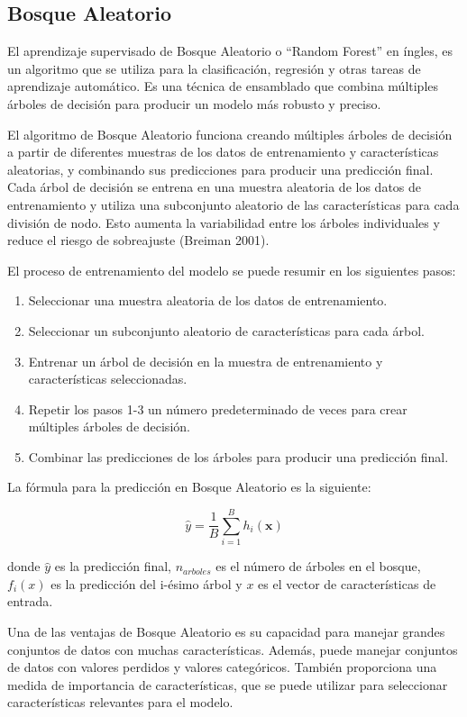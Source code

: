 \documentclass[a4paper,12pt]{article}
\begin{document}
\subsection{Bosque Aleatorio}

El aprendizaje supervisado de Bosque Aleatorio o ``Random Forest'' en íngles, es un algoritmo que se utiliza para la clasificación, regresión y otras tareas de aprendizaje automático. Es una técnica de ensamblado que combina múltiples árboles de decisión para producir un modelo más robusto y preciso.

El algoritmo de Bosque Aleatorio funciona creando múltiples árboles de decisión a partir de diferentes muestras de los datos de entrenamiento y características aleatorias, y combinando sus predicciones para producir una predicción final. Cada árbol de decisión se entrena en una muestra aleatoria de los datos de entrenamiento y utiliza una subconjunto aleatorio de las características para cada división de nodo. Esto aumenta la variabilidad entre los árboles individuales y reduce el riesgo de sobreajuste (Breiman 2001).

El proceso de entrenamiento del modelo se puede resumir en los siguientes pasos:

\begin{enumerate}
    \item Seleccionar una muestra aleatoria de los datos de entrenamiento.
    \item Seleccionar un subconjunto aleatorio de características para cada árbol.
    \item Entrenar un árbol de decisión en la muestra de entrenamiento y características seleccionadas.
    \item Repetir los pasos 1-3 un número predeterminado de veces para crear múltiples árboles de decisión.
    \item Combinar las predicciones de los árboles para producir una predicción final.
\end{enumerate}

La fórmula para la predicción en Bosque Aleatorio es la siguiente:

$$\hat{y} = \frac{1}{B}\sum_{i=1}^{B}h_i(\mathbf{x})$$

donde $\hat{y}$ es la predicción final, $n_{arboles}$ es el número de árboles en el bosque, $f_i(x)$ es la predicción del i-ésimo árbol y $x$ es el vector de características de entrada.

Una de las ventajas de Bosque Aleatorio es su capacidad para manejar grandes conjuntos de datos con muchas características. Además, puede manejar conjuntos de datos con valores perdidos y valores categóricos. También proporciona una medida de importancia de características, que se puede utilizar para seleccionar características relevantes para el modelo.
\end{document}
